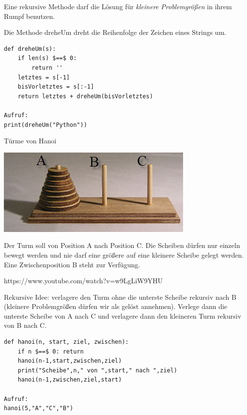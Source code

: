 \documentclass{beamer}
\begin{document}
\begin{frame}[fragile]
Eine rekursive Methode darf die Lösung für \textit{kleinere Problemgrößen} in ihrem Rumpf benutzen. 

Die Methode dreheUm dreht die Reihenfolge der Zeichen eines Strings um. \pause
\begin{lstlisting} 
def dreheUm(s):
    if len(s) $==$ 0:
        return ''
    letztes = s[-1]
    bisVorletztes = s[:-1]
    return letztes + dreheUm(bisVorletztes)

Aufruf:
print(dreheUm("Python"))
\end{lstlisting} 
\end{frame}

\begin{frame}[fragile]
Türme von Hanoi

\includegraphics[scale=0.6]{Hanoi.png} 

Der Turm soll von Position A nach Position C. Die Scheiben dürfen nur einzeln bewegt werden und nie darf eine größere auf eine kleinere Scheibe gelegt werden. Eine Zwischenposition B steht zur Verfügung. 

https://www.youtube.com/watch?v=w9LgLiW9YHU \pause

Rekursive Idee: verlagere den Turm ohne die unterste Scheibe rekursiv nach B (kleinere Problemgrößen dürfen wir als
gelöst annehmen). Verlege dann die unterste Scheibe von A nach C und verlagere dann den kleineren Turm rekursiv von B nach C.
\end{frame}

\begin{frame}[fragile]
\begin{lstlisting} 
def hanoi(n, start, ziel, zwischen):
    if n $==$ 0: return
    hanoi(n-1,start,zwischen,ziel)
    print("Scheibe",n," von ",start," nach ",ziel)
    hanoi(n-1,zwischen,ziel,start)
    
Aufruf:
hanoi(5,"A","C","B")
\end{lstlisting} 
\end{frame}
\end{document}
